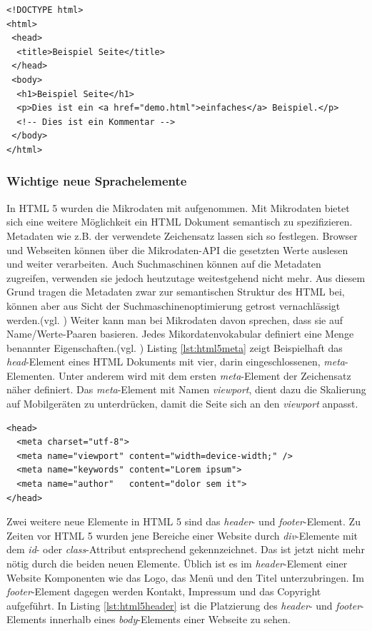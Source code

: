 	\vspace{1em}
	\lstset{language=html}
	\begin{lstlisting}[frame=htrbl, caption=HTML 5 Basis Dokument, label=lst:html5basicdoc]
<!DOCTYPE html>
<html>
 <head>
  <title>Beispiel Seite</title>
 </head>
 <body>
  <h1>Beispiel Seite</h1>
  <p>Dies ist ein <a href="demo.html">einfaches</a> Beispiel.</p>
  <!-- Dies ist ein Kommentar -->
 </body>
</html>
	\end{lstlisting}
	
\subsubsection{Wichtige neue Sprachelemente} In HTML 5 wurden die Mikrodaten mit aufgenommen. Mit Mikrodaten bietet sich eine weitere Möglichkeit ein HTML Dokument semantisch zu spezifizieren. Metadaten wie z.B. der verwendete Zeichensatz lassen sich so festlegen. Browser und Webseiten können über die Mikrodaten-API die gesetzten Werte auslesen und weiter verarbeiten. Auch Suchmaschinen können auf die Metadaten zugreifen, verwenden sie jedoch heutzutage weitestgehend nicht mehr. Aus diesem Grund tragen die Metadaten zwar zur semantischen Struktur des HTML bei, können aber aus Sicht der Suchmaschinenoptimierung getrost vernachlässigt werden.(vgl. \cite{SelfHtml20142}) Weiter kann man bei Mikrodaten davon sprechen, \glqq [...] dass sie auf Name/Werte-Paaren basieren. Jedes Mikordatenvokabular definiert eine Menge benannter Eigenschaften.\grqq{}(vgl. \cite[S.174]{PilgDurc2011}) Listing \ref{lst:html5meta} zeigt Beispielhaft das \textit{head}-Element eines HTML Dokuments mit vier, darin eingeschlossenen, \textit{meta}-Elementen. Unter anderem wird mit dem ersten \textit{meta}-Element der Zeichensatz näher definiert. Das \textit{meta}-Element mit Namen \textit{viewport}, dient dazu die Skalierung auf Mobilgeräten zu unterdrücken, damit die Seite sich an den \textit{viewport} anpasst.

    \vspace{1em}
    \lstset{language=html}
	\begin{lstlisting}[frame=htrbl, caption=HTML 5 \textit{meta}-Element, label=lst:html5meta]
<head>
  <meta charset="utf-8">
  <meta name="viewport" content="width=device-width;" />
  <meta name="keywords" content="Lorem ipsum">
  <meta name="author"   content="dolor sem it">
</head>
	\end{lstlisting}
		
Zwei weitere neue Elemente in HTML 5 sind das \textit{header}- und \textit{footer}-Element. Zu Zeiten vor HTML 5 wurden jene Bereiche einer Website durch \textit{div}-Elemente mit dem \textit{id}- oder \textit{class}-Attribut entsprechend gekennzeichnet. Das ist jetzt nicht mehr nötig durch die beiden neuen Elemente. Üblich ist es im \textit{header}-Element einer Website Komponenten wie das Logo, das Menü und den Titel unterzubringen. Im \textit{footer}-Element dagegen werden Kontakt, Impressum und das Copyright aufgeführt. In Listing \ref{lst:html5header}	 ist die Platzierung des \textit{header}- und \textit{footer}-Elements innerhalb eines \textit{body}-Elements einer Webseite zu sehen.

